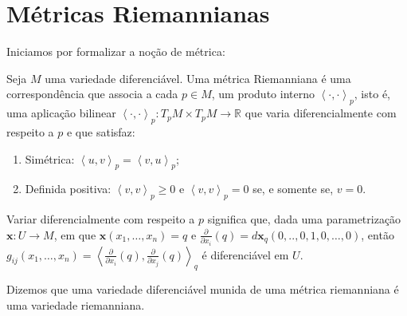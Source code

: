 \section{Métricas Riemannianas}
\label{loc:capítulo_3_:_métricas_e_conexões.métricas_riemannianas}
Iniciamos por formalizar a noção de métrica:
\begin{definition}
    \label{loc:2.1_:_def_1_:_métrica_riemanniana.definição}
    Seja $M$ uma variedade diferenciável. Uma métrica Riemanniana é uma correspondência que associa a cada $p \in M$, um produto interno $\left<\cdot, \cdot\right>_{p}$, isto é, uma aplicação bilinear $\left<\cdot,\cdot\right>_{p}:T_{p}M\times T_{p}M\to \mathbb{R}$ que varia diferencialmente com respeito a $p$ e que satisfaz:
    \begin{enumerate}
        \item Simétrica: $\left<u, v\right>_{p}= \left<v,u\right>_{p}$;
        \item Definida positiva: $\left<v, v\right>_{p} \geq 0$ e $\left<v,v\right>_{p}=0$ se, e somente se, $v=0$.
    \end{enumerate}

    Variar diferencialmente com respeito a $p$ significa que, dada uma parametrização $\mathbf{x}:U\to M$, em que $\mathbf{x}(x_{1}, \dots, x_{n})=q$ e $\frac{\partial}{\partial x_{i}}(q)=d\mathbf{x}_{q}(0, .., 0, 1, 0, \dots, 0)$, então $g_{ij}(x_{1}, \dots, x_{n})=\left<\frac{\partial}{\partial x_{i}}(q),\frac{\partial}{\partial x_{j}}(q)\right>_{q}$ é diferenciável em $U$.
\end{definition}
Dizemos que uma variedade diferenciável munida de uma métrica riemanniana é uma variedade riemanniana.

